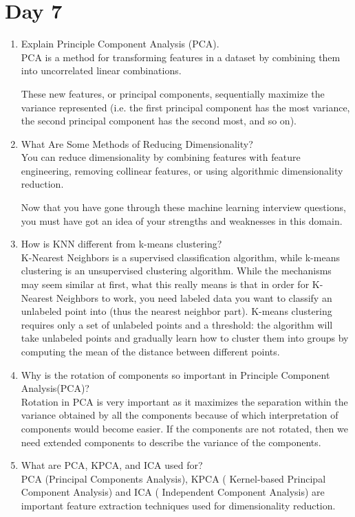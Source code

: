 \documentclass[11pt]{article}
\begin{document}
\section{Day 7}
\begin{enumerate}
\item Explain Principle Component Analysis (PCA).\\[.5em]
PCA is a method for transforming features in a dataset by combining them into uncorrelated
linear combinations.

These new features, or principal components, sequentially maximize the variance represented
(i.e. the first principal component has the most variance, the second principal component has
the second most, and so on).

\item What Are Some Methods of Reducing Dimensionality?\\[.5em]
You can reduce dimensionality by combining features with feature engineering, removing
collinear features, or using algorithmic dimensionality reduction.

Now that you have gone through these machine learning interview questions, you must have
got an idea of your strengths and weaknesses in this domain.

\item How is KNN different from k-means clustering?\\[.5em]
K-Nearest Neighbors is a supervised classification algorithm, while k-means clustering is an
unsupervised clustering algorithm. While the mechanisms may seem similar at first, what this
really means is that in order for K-Nearest Neighbors to work, you need labeled data you want
to classify an unlabeled point into (thus the nearest neighbor part). K-means clustering requires
only a set of unlabeled points and a threshold: the algorithm will take unlabeled points and
gradually learn how to cluster them into groups by computing the mean of the distance between
different points.

\item Why is the rotation of components so important in Principle Component
Analysis(PCA)?\\[.5em]
Rotation in PCA is very important as it maximizes the separation within the variance obtained by
all the components because of which interpretation of components would become easier. If the
components are not rotated, then we need extended components to describe the variance of
the components.

\item What are PCA, KPCA, and ICA used for?\\[.5em]
PCA (Principal Components Analysis), KPCA ( Kernel-based Principal Component Analysis)
and ICA ( Independent Component Analysis) are important feature extraction techniques used
for dimensionality reduction.


\end{enumerate}
\end{document}
